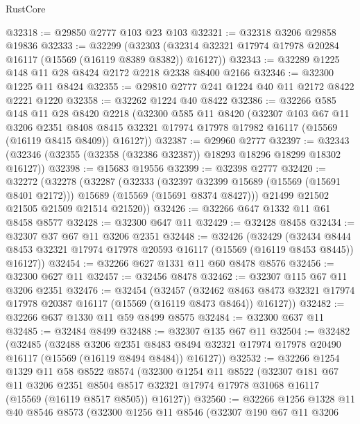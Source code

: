 \begin{lexlean}{RustCore}
\begin{coremodule}
@32318 := @29850 @2777 @103 @23 @103
@32321 := @32318 @3206 @29858 @19836
@32333 := @32299
    (@32303 (@32314 @32321 @17974 @17978 @20284 @16117 (@15569 (@16119 @8389 @8382)) @16127))
@32343 := @32289 @1225 @148 @11 @28 @8424 @2172 @2218 @2338 @8400 @2166
@32346 := @32300 @1225 @11 @8424
@32355 := @29810 @2777 @241 @1224 @40 @11 @2172 @8422 @2221 @1220
@32358 := @32262 @1224 @40 @8422
@32386 := @32266
    @585
    @148
    @11
    @28
    @8420
    @2218
    (@32300
      @585
      @11
      @8420
      (@32307
        @103
        @67
        @11
        @3206
        @2351
        @8408
        @8415
        @32321
        @17974
        @17978
        @17982
        @16117
        (@15569 (@16119 @8415 @8409))
        @16127))
@32387 := @29960 @2777
@32397 := @32343 (@32346 (@32355 (@32358 (@32386 @32387)) @18293 @18296 @18299 @18302 @16127))
@32398 := @15683 @19556
@32399 := @32398 @2777
@32420 := @32272
    (@32278
      (@32287
        (@32333
          (@32397 @32399 @15689 (@15569 (@15691 @8401 @2172)))
          @15689
          (@15569 (@15691 @8374 @8427)))
        @21499
        @21502
        @21505
        @21509
        @21514
        @21520))
@32426 := @32266 @647 @1332 @11 @61 @8458 @8577
@32428 := @32300 @647 @11
@32429 := @32428 @8458
@32434 := @32307 @37 @67 @11 @3206 @2351
@32448 := @32426
    (@32429
      (@32434 @8444 @8453 @32321 @17974 @17978 @20593 @16117 (@15569 (@16119 @8453 @8445)) @16127))
@32454 := @32266 @627 @1331 @11 @60 @8478 @8576
@32456 := @32300 @627 @11
@32457 := @32456 @8478
@32462 := @32307 @115 @67 @11 @3206 @2351
@32476 := @32454
    (@32457
      (@32462 @8463 @8473 @32321 @17974 @17978 @20387 @16117 (@15569 (@16119 @8473 @8464)) @16127))
@32482 := @32266 @637 @1330 @11 @59 @8499 @8575
@32484 := @32300 @637 @11
@32485 := @32484 @8499
@32488 := @32307 @135 @67 @11
@32504 := @32482
    (@32485
      (@32488
        @3206
        @2351
        @8483
        @8494
        @32321
        @17974
        @17978
        @20490
        @16117
        (@15569 (@16119 @8494 @8484))
        @16127))
@32532 := @32266
    @1254
    @1329
    @11
    @58
    @8522
    @8574
    (@32300
      @1254
      @11
      @8522
      (@32307
        @181
        @67
        @11
        @3206
        @2351
        @8504
        @8517
        @32321
        @17974
        @17978
        @31068
        @16117
        (@15569 (@16119 @8517 @8505))
        @16127))
@32560 := @32266
    @1256
    @1328
    @11
    @40
    @8546
    @8573
    (@32300
      @1256
      @11
      @8546
      (@32307
        @190
        @67
        @11
        @3206

\end{coremodule}
\end{lexlean}
